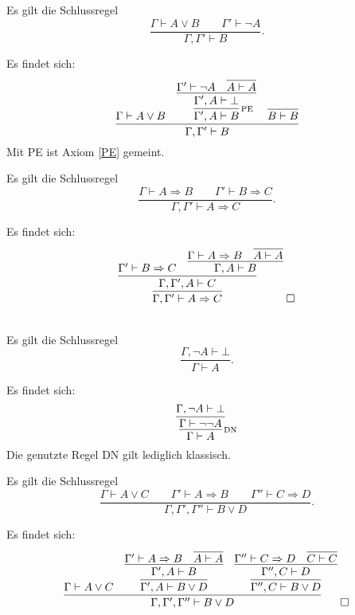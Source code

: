 \begin{Satz}
Es gilt die Schlussregel
\[\dfrac{\Gamma\vdash A\lor B\qquad\Gamma'\vdash \neg A}{\Gamma,\Gamma'\vdash B}.\]
\end{Satz}
\begin{Beweis}
Es findet sich:
\[\infer{\Gamma,\Gamma'\vdash B}{
  \Gamma\vdash A\lor B
  & \infer[\infernote{PE}]{\Gamma',A\vdash B}{
      \infer{\Gamma',A\vdash\bot}{
        \Gamma'\vdash\neg A & \infer{A\vdash A}{}}}
  & \infer{B\vdash B}{}}\]
Mit PE ist Axiom \ref{PE} gemeint.\,\qedsymbol
\end{Beweis}

\begin{Satz}[Kettenschluss]
Es gilt die Schlussregel
\[\dfrac{\Gamma\vdash A\Rightarrow B\qquad\Gamma'\vdash B\Rightarrow C}
{\Gamma,\Gamma'\vdash A\Rightarrow C}.\]
\end{Satz}
\begin{Beweis} Es findet sich:
\[\infer{\Gamma,\Gamma'\vdash A\Rightarrow C}{
  \infer{\Gamma,\Gamma',A\vdash C}{
    \Gamma'\vdash B\Rightarrow C &
      \infer{\Gamma,A\vdash B}{
        \Gamma\vdash A\Rightarrow B
        & \infer{A\vdash A}{}}}}\;\qedsymbol
\]
\end{Beweis}

\begin{Satz} \strong{[LEM]}\\
Es gilt die Schlussregel
\[\dfrac{\Gamma,\neg A\vdash\bot}{\Gamma\vdash A}.\]
\end{Satz}
\begin{Beweis} Es findet sich:
\[\infer[\infernote{DN}]{\Gamma\vdash A}{
  \infer{\Gamma\vdash\neg\neg A}{
    \Gamma,\neg A\vdash\bot}}
\]
Die genutzte Regel DN gilt lediglich klassisch.\,\qedsymbol
\end{Beweis}

\begin{Satz}\label{destructive-dilemma}
Es gilt die Schlussregel
\[\dfrac{\Gamma\vdash A\lor C\qquad
\Gamma'\vdash A\Rightarrow B\qquad\Gamma''\vdash C\Rightarrow D}{
\Gamma,\Gamma',\Gamma''\vdash B\lor D}.\]
\end{Satz}
\begin{Beweis}
Es findet sich:
\[\infer{\Gamma,\Gamma',\Gamma''\vdash B\lor D}{
  \Gamma\vdash A\lor C
  & \infer{\Gamma',A\vdash B\lor D}{
      \infer{\Gamma',A\vdash B}{
        \Gamma'\vdash A\Rightarrow B
        & \infer{A\vdash A}{}}}
  & \infer{\Gamma'',C\vdash B\lor D}{
      \infer{\Gamma'',C\vdash D}{
        \Gamma''\vdash C\Rightarrow D
        & \infer{C\vdash C}{}}}}\;\qedsymbol
\]
\end{Beweis}

